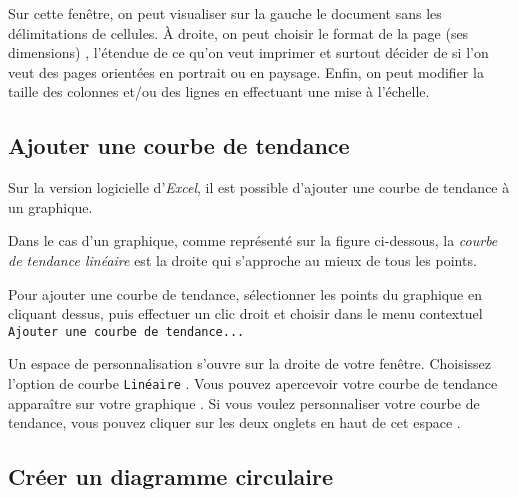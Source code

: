 Sur cette fenêtre, on peut visualiser sur la gauche le document sans les délimitations de cellules. À droite, on peut choisir le format de la page (ses dimensions) , l'étendue de ce qu'on veut imprimer  et surtout décider de si l'on veut des pages orientées en portrait ou en paysage.  Enfin, on peut modifier la taille des colonnes et/ou des lignes en effectuant une mise à l'échelle. 



\subsection{Ajouter une courbe de tendance}\label{Calc2CourbeTendance} 

Sur la version logicielle d'\emph{Excel}, il est possible d'ajouter une courbe de tendance à un graphique.

Dans le cas d'un graphique, comme représenté sur la figure ci-dessous, la \emph{courbe de tendance linéaire} est la droite qui s'approche au mieux de tous les points. 



Pour ajouter une courbe de tendance, sélectionner les points du graphique en cliquant dessus, puis effectuer un clic droit et choisir dans le menu contextuel \texttt{Ajouter une courbe de tendance...}

%

Un espace de personnalisation s'ouvre sur la droite de votre fenêtre. Choisissez l'option de courbe \texttt{Linéaire} . Vous pouvez apercevoir votre courbe de tendance apparaître sur votre graphique . Si vous voulez personnaliser votre courbe de tendance, vous pouvez cliquer sur les deux onglets en haut de cet espace .



\subsection{Créer un diagramme circulaire}\label{Calc2DiagCirculaire}

